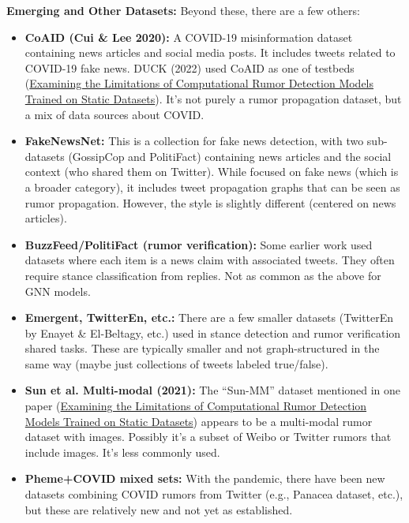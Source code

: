 \documentclass[12pt,a4paper]{report}
\begin{document}
\textbf{Emerging and Other Datasets:} Beyond these, there are a few others:
\begin{itemize}[leftmargin=1.2cm]
    \item \textbf{CoAID (Cui \& Lee 2020):} A COVID-19 misinformation dataset containing news articles and social media posts. It includes tweets related to COVID-19 fake news. DUCK (2022) used CoAID as one of testbeds (\href{https://arxiv.org/html/2309.11576v2#:~:text=Recent%20hybrid%20models%20began%20including,Ma}{Examining the Limitations of Computational Rumor Detection Models Trained on Static Datasets}). It’s not purely a rumor propagation dataset, but a mix of data sources about COVID.
    \item \textbf{FakeNewsNet:} This is a collection for fake news detection, with two sub-datasets (GossipCop and PolitiFact) containing news articles and the social context (who shared them on Twitter). While focused on fake news (which is a broader category), it includes tweet propagation graphs that can be seen as rumor propagation. However, the style is slightly different (centered on news articles).
    \item \textbf{BuzzFeed/PolitiFact (rumor verification):} Some earlier work used datasets where each item is a news claim with associated tweets. They often require stance classification from replies. Not as common as the above for GNN models.
    \item \textbf{Emergent, TwitterEn, etc.:} There are a few smaller datasets (TwitterEn by Enayet \& El-Beltagy, etc.) used in stance detection and rumor verification shared tasks. These are typically smaller and not graph-structured in the same way (maybe just collections of tweets labeled true/false).
    \item \textbf{Sun et al. Multi-modal (2021):} The “Sun-MM” dataset mentioned in one paper (\href{https://arxiv.org/html/2309.11576v2#:~:text=Statistic%20Twitter%2015%20Twitter%2016,242%20202%208%2C484%2013%2C592}{Examining the Limitations of Computational Rumor Detection Models Trained on Static Datasets}) appears to be a multi-modal rumor dataset with images. Possibly it’s a subset of Weibo or Twitter rumors that include images. It’s less commonly used.
    \item \textbf{Pheme+COVID mixed sets:} With the pandemic, there have been new datasets combining COVID rumors from Twitter (e.g., Panacea dataset, etc.), but these are relatively new and not yet as established.
\end{itemize}
\end{document}
